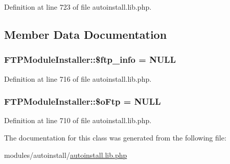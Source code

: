 Definition at line 723 of file autoinstall.\+lib.\+php.



\subsection{Member Data Documentation}
\subsubsection[{\texorpdfstring{\$ftp\+\_\+info}{$ftp_info}}]{\setlength{\rightskip}{0pt plus 5cm}F\+T\+P\+Module\+Installer\+::\$ftp\+\_\+info = N\+U\+LL}\hypertarget{classFTPModuleInstaller_afd92e3672f27df9d0056f759cfb4206c}{}\label{classFTPModuleInstaller_afd92e3672f27df9d0056f759cfb4206c}


Definition at line 716 of file autoinstall.\+lib.\+php.

\subsubsection[{\texorpdfstring{\$o\+Ftp}{$oFtp}}]{\setlength{\rightskip}{0pt plus 5cm}F\+T\+P\+Module\+Installer\+::\$o\+Ftp = N\+U\+LL}\hypertarget{classFTPModuleInstaller_a7df6cf65240fbb39a7d763e10b236dc9}{}\label{classFTPModuleInstaller_a7df6cf65240fbb39a7d763e10b236dc9}


Definition at line 710 of file autoinstall.\+lib.\+php.



The documentation for this class was generated from the following file\+:\begin{DoxyCompactItemize}
\item 
modules/autoinstall/\hyperlink{autoinstall_8lib_8php}{autoinstall.\+lib.\+php}\end{DoxyCompactItemize}
